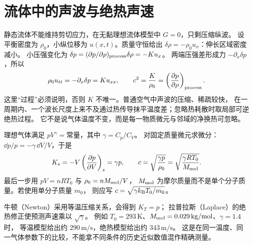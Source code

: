 \section{流体中的声波与绝热声速}

静态流体不能维持剪切应力，在无黏理想流体模型中 $G=0$，只剩压缩纵波。
设平衡密度为 $\rho_0$，小纵位移为 $u(x,t)$。质量守恒给出
$\delta\rho=-\rho_0 u_x$：伸长区域密度减小。
小压强变化为
$\delta p=(\partial p/\partial\rho)_{\rm process}\delta\rho=-K u_x$。
两端压强差形成力 $-\partial_x\delta p$，所以
\[
 \rho_0u_{tt}=-\partial_x\delta p=K u_{xx},\qquad
 c^2=\frac K{\rho_0}=\left(\frac{\partial p}{\partial\rho}\right)_{\rm process}.
\]
这里“过程”必须说明，否则 $K$ 不唯一。普通空气中声波的压缩、稀疏较快，
在一周期内、一个波长尺度上来不及通过热传导抹平温度差；忽略热耗散时取局部可逆绝热过程。
它不是说气体温度不变，而是每一物质微元与邻域的净换热可忽略。

理想气体满足 $pV^\gamma=\text{常量}$，其中 $\gamma=C_p/C_V$。
对固定质量微元求微分：
$\dd p/p=-\gamma\,\dd V/V$，于是
\begin{equation}
 K_s=-V\left(\frac{\partial p}{\partial V}\right)_s=\gamma p,\qquad
 c=\sqrt{\frac{\gamma p}{\rho_0}}
  =\sqrt{\frac{\gamma RT_0}{M_{\rm mol}}}.
 \label{ch12:eq:sound-speed}
\end{equation}
最后一步用 $pV=nRT_0$ 与 $\rho_0=nM_{\rm mol}/V$，
$M_{\rm mol}$ 为摩尔质量而不是单个分子质量。若使用单分子质量 $m_0$，
则应写 $c=\sqrt{\gamma k_{\rm B}T_0/m_0}$。

牛顿（Newton）采用等温压缩关系，会得到 $K_T=p$；
拉普拉斯（Laplace）的绝热修正使预测声速乘以 $\sqrt\gamma$。
例如 $T_0=293\,\mathrm K$、$M_{\rm mol}=0.029\,\mathrm{kg/mol}$、$\gamma=1.4$ 时，
等温模型给出约 $290\,\mathrm{m/s}$，绝热模型给出约 $343\,\mathrm{m/s}$。
这是在同一温度、同一气体参数下的比较，不能拿不同条件的历史近似数值混作精确测量。
